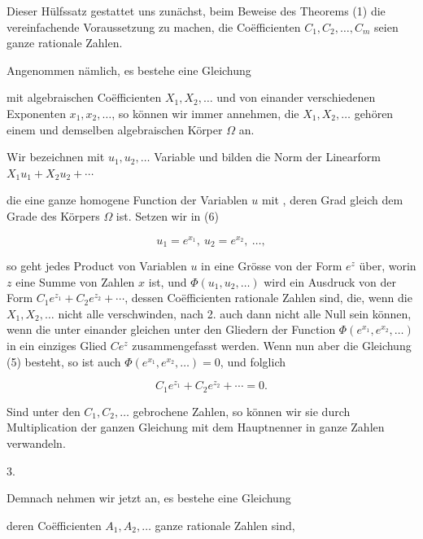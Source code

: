 Dieser Hülfssatz gestattet uns zunächst, beim Beweise des Theorems (1) die vereinfachende Voraussetzung zu machen, die Coëfficienten $C_1, C_2, \ldots, C_m$ seien ganze rationale Zahlen.

Angenommen nämlich, es bestehe eine Gleichung


mit algebraischen Coëfficienten $X_1, X_2, \ldots$ und von einander verschiedenen Exponenten $x_1, x_2, \ldots$, so können wir immer annehmen, die $X_1, X_2, \ldots$ gehören einem und demselben algebraischen Körper $\Omega$ an.

Wir bezeichnen mit $u_1, u_2, \ldots$ Variable und bilden die Norm der Linearform $X_1u_1+X_2u_2+\cdots$


die eine ganze homogene Function der Variablen $u$ mit , deren Grad gleich dem Grade des Körpers $\Omega$ ist. Setzen wir in (6)

\[
u_1 = e^{x_1},\ u_2 = e^{x_2},\ \ldots,
\]

so geht jedes Product von Variablen $u$ in eine Grösse von der Form $e^z$ über, worin $z$ eine Summe von Zahlen $x$ ist, und $\Phi(u_1,u_2,\ldots)$ wird ein Ausdruck von der Form $C_1e^{z_1}+C_2e^{z_2}+\cdots$, dessen Coëfficienten rationale Zahlen sind, die, wenn die $X_1, X_2, \ldots$ nicht alle verschwinden, nach 2. auch dann nicht alle Null sein können, wenn die unter einander gleichen unter den Gliedern der Function $\Phi(e^{x_1},e^{x_2},\ldots)$ in ein einziges Glied $Ce^z$ zusammengefasst werden. Wenn nun aber die Gleichung (5) besteht, so ist auch $\Phi(e^{x_1},e^{x_2},\ldots)=0$, und folglich

\[
C_1e^{z_1}+C_2e^{z_2}+\cdots = 0.
\]

Sind unter den $C_1, C_2, \ldots$ gebrochene Zahlen, so können wir sie durch Multiplication der ganzen Gleichung mit dem Hauptnenner in ganze Zahlen verwandeln.

3. 

Demnach nehmen wir jetzt an, es bestehe eine Gleichung


deren Coëfficienten $A_1, A_2, \ldots$ ganze rationale Zahlen sind,
